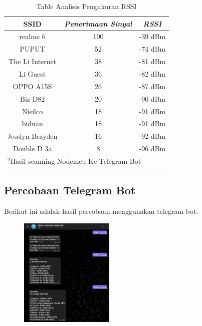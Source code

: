 \documentclass[conference]{IEEEtran}
\begin{document}
 \begin{table}[htbp]
    \caption{Table Analisis Pengukuran RSSI}
    \begin{center}
    \begin{tabular}{|c|c|c|}
        \hline
    \textbf{SSID} &  \textbf{\textit{Penerimaan Sinyal}}& \textbf{\textit{RSSI}} \\
    \hline
    realme 6 & 100 & -39 dBm   \\
    \hline
    PUPUT & 52 & -74 dBm   \\
    \hline
    The Li Internet & 38 & -81 dBm   \\
    \hline
    Li Guest  & 36 & -82 dBm   \\
    \hline
    OPPO A15S  & 26 & -87 dBm   \\
    \hline
    Biz D82  & 20 & -90 dBm   \\
    \hline
    Nisilco  & 18 & -91 dBm   \\
    \hline
    biduan  & 18 & -91 dBm   \\
    \hline
    Jesslyn Brayden  & 16 & -92 dBm   \\
    \hline
    Double D 3a  & 8 & -96 dBm   \\
    \hline

    \multicolumn{3}{l}{$^{\mathrm{2}}$Hasil scanning Nodemcu Ke Telegram Bot}
    \end{tabular}
    \label{tab2}
    \end{center}
    \end{table}


    \subsection{Percobaan Telegram Bot}
    Berikut ini adalah hasil percobaan menggunakan telegram bot.
    \begin{figure}[h]
        \centering
        \includegraphics[width=0.4\textwidth]{telebott.png}
    \end{figure}
\end{document}
